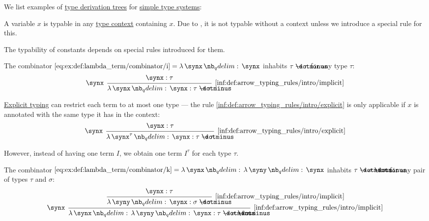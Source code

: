 \begin{example}\label{ex:def:type_derivation_tree}
  We list examples of \hyperref[def:type_derivation_tree]{type derivation trees} for \hyperref[def:simple_type_system]{simple type systems}:
  \begin{thmenum}
     A variable \( x \) is typable in any \hyperref[def:type_context]{type context} containing \( x \). Due to , it is not typable without a context unless we introduce a special rule for this.

     The typability of constants depends on special rules introduced for them.

     The combinator \( \ref{eq:ex:def:lambda_term/combinator/i} = \qabs \synx \synx \) inhabits \( \tau \synimplies \tau \) for any type \( \tau \):
    \begin{equation*}
      \begin{prooftree}
        \hypo{ \synx: \tau }
        \infer[left label=\( \synx \)]1[\ref{inf:def:arrow_typing_rules/intro/implicit}]{ \qabs \synx \synx: \tau \synimplies \tau }
      \end{prooftree}
    \end{equation*}

    \hyperref[def:simple_type_system_style]{Explicit typing} can restrict each term to at most one type --- the rule \ref{inf:def:arrow_typing_rules/intro/explicit} is only applicable if \( x \) is annotated with the same type it has in the context:
    \begin{equation*}
      \begin{prooftree}
        \hypo{ \synx: \tau }
        \infer[left label=\( \synx \)]1[\ref{inf:def:arrow_typing_rules/intro/explicit}]{ \qabs {\synx^\tau} \synx: \tau \synimplies \tau }
      \end{prooftree}
    \end{equation*}

    However, instead of having one term \( I \), we obtain one term \( I^\tau \) for each type \( \tau \).

     The combinator \( \ref{eq:ex:def:lambda_term/combinator/k} = \qabs \synx \qabs \syny \synx \) inhabits \( \tau \synimplies \sigma \synimplies \tau \) for any pair of types \( \tau \) and \( \sigma \):
    \begin{equation*}
      \begin{prooftree}
        \hypo{ \synx: \tau }
        \infer1[\ref{inf:def:arrow_typing_rules/intro/implicit}]{ \qabs \syny \synx: \sigma \synimplies \tau }
        \infer[left label=\( \synx \)]1[\ref{inf:def:arrow_typing_rules/intro/implicit}]{ \qabs \synx \qabs \syny \synx: \tau \synimplies \sigma \synimplies \tau }
      \end{prooftree}
    \end{equation*}


\end{thmenum}
\end{example}
